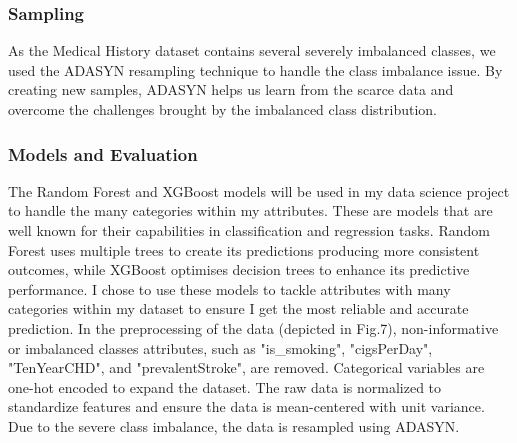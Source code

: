 \documentclass[conference]{IEEEtran}
\begin{document}
\subsubsection{Sampling}
As the Medical History dataset contains several severely imbalanced classes, we used the ADASYN resampling technique to handle the class imbalance issue. By creating new samples, ADASYN helps us learn from the scarce data and overcome the challenges brought by the imbalanced class distribution.

\subsubsection{Models and Evaluation}
The Random Forest and XGBoost models will be used in my data science project to handle the many categories within my attributes. These are models that are well known for their capabilities in classification and regression tasks. Random Forest uses multiple trees to create its predictions producing more consistent outcomes, while XGBoost optimises decision trees to enhance its predictive performance. I chose to use these models to tackle attributes with many categories within my dataset to ensure I get the most reliable and accurate prediction.
In the preprocessing of the data (depicted in Fig.7), non-informative or imbalanced classes attributes, such as "is\_smoking", "cigsPerDay", "TenYearCHD", and "prevalentStroke", are removed. Categorical variables are one-hot encoded to expand the dataset. The raw data is normalized to standardize features and ensure the data is mean-centered with unit variance. Due to the severe class imbalance, the data is resampled using ADASYN.
\end{document}
